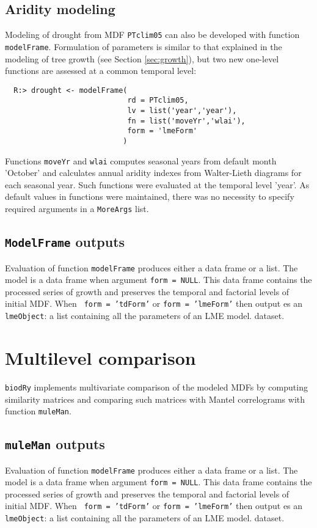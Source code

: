 \documentclass[review,authoryear]{elsarticle}
\begin{document}
\subsection{Aridity modeling}\label{sec:armod}

Modeling of drought from MDF {\tt PTclim05} can also be developed with
function {\tt modelFrame}. Formulation of parameters is similar to
that explained in the modeling of tree growth (see Section
\ref{sec:growth}), but two new one-level functions are assessed at a
common temporal level:

\begin{verbatim}
  R:> drought <- modelFrame(
                            rd = PTclim05,
                            lv = list('year','year'),
                            fn = list('moveYr','wlai'),
                            form = 'lmeForm'              
                           )
\end{verbatim}

 Functions {\tt moveYr} and {\tt wlai} computes seasonal years from
 default month 'October' and calculates annual aridity indexes from
 Walter-Lieth diagrams for each seasonal year. Such functions were
 evaluated at the temporal level 'year'. As default values in
 functions were maintained, there was no necessity to specify required
 arguments in a {\tt MoreArgs} list.

\subsection{{\tt ModelFrame} outputs}
Evaluation of function {\tt modelFrame} produces either a data frame
or a list. The model is a data frame when argument {\tt form =
  NULL}. This data frame contains the processed series of growth and
preserves the temporal and factorial levels of initial MDF. When {\tt
  form = 'tdForm'} or {\tt form = 'lmeForm'} then output es an {\tt
  lmeObject}: a list containing all the parameters of an LME model.
dataset.



\section{Multilevel comparison}

{\tt biodRy} implements multivariate comparison of the modeled MDFs by
computing similarity matrices and comparing such matrices with Mantel
correlograms with function {\tt muleMan}.

\subsection{{\tt muleMan} outputs}
Evaluation of function {\tt modelFrame} produces either a data frame
or a list. The model is a data frame when argument {\tt form =
  NULL}. This data frame contains the processed series of growth and
preserves the temporal and factorial levels of initial MDF. When {\tt
  form = 'tdForm'} or {\tt form = 'lmeForm'} then output es an {\tt
  lmeObject}: a list containing all the parameters of an LME model.
dataset.
\end{document}
